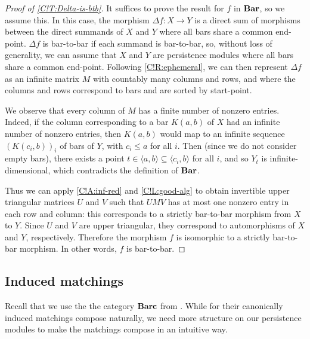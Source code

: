 \begin{proof}[Proof of \cref{C!T:Delta-is-btb}]
  It suffices to prove the result for $f$ in $\Bar$, so we assume this. In this case, the morphism $\Delta f \colon X \to Y$ is a direct sum of morphisms between the direct summands of $X$ and $Y$ where all bars share a common end-point. $\Delta f$ is bar-to-bar if each summand is bar-to-bar, so, without loss of generality, we can assume that $X$ and $Y$ are persistence modules where all bars share a common end-point. Following \cref{C!R:ephemeral}, we can then represent $\Delta f$ as an infinite matrix $M$ with countably many columns and rows, and where the columns and rows correspond to bars and are sorted by start-point.

  We observe that every column of $M$ has a finite number of nonzero entries. Indeed, if the column corresponding to a bar $K(a, b)$ of $X$ had an infinite number of nonzero entries, then $K(a, b)$ would map to an infinite sequence $(K(c_i, b))_i$ of bars of $Y$, with $c_i \leq a$ for all $i$. Then (since we do not consider empty bars), there exists a point $t \in \langle a, b \rangle \subseteq \langle c_i, b \rangle$ for all $i$, and so $Y_t$ is infinite-dimensional, which contradicts the definition of $\Bar$.

  Thus we can apply \cref{C!A:inf-red} and \cref{C!L:good-alg} to obtain invertible upper triangular matrices $U$ and $V$ such that $U M V$ has at most one nonzero entry in each row and column: this corresponds to a strictly bar-to-bar morphism from $X$ to $Y$. Since $U$ and $V$ are upper triangular, they correspond to automorphisms of $X$ and $Y$, respectively. Therefore the morphism $f$ is isomorphic to a strictly bar-to-bar morphism. In other words, $f$ is bar-to-bar.
\end{proof}

\subsection{Induced matchings}

Recall that we use the the category $\Barc$ from \cite{BauerLesnick2020}. While for their canonically induced matchings compose naturally, we need more structure on our persistence modules to make the matchings compose in an intuitive way.


